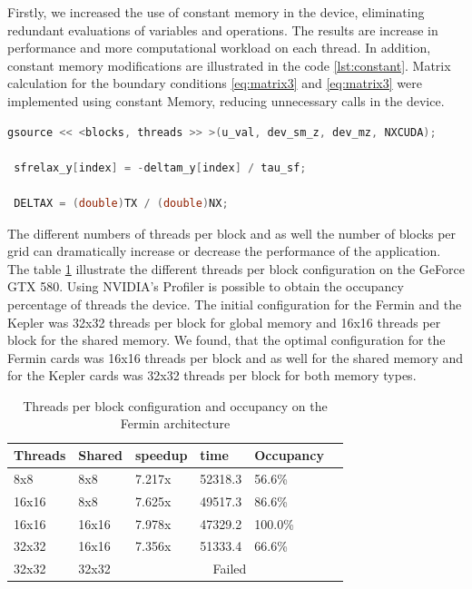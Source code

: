 Firstly, we increased the use of constant memory in the device, eliminating redundant evaluations of variables and operations. The results are increase in performance and more computational workload on each thread. In addition, constant memory modifications are illustrated in the code \ref{lst:constant}. Matrix calculation for the boundary conditions \ref{eq:matrix3} and \ref{eq:matrix3} were implemented using constant Memory, reducing unnecessary calls in the device.
 
 \begin{lstlisting}[language=C++,  label={lst:constant}, caption={Constant Memory changes}]
 gsource << <blocks, threads >> >(u_val, dev_sm_z, dev_mz, NXCUDA);
 
 sfrelax_y[index] = -deltam_y[index] / tau_sf;
     
 DELTAX = (double)TX / (double)NX;
\end{lstlisting}
 
The different numbers of threads per block and as well the number of blocks per grid can dramatically increase or decrease the performance of the application. The table \ref{tab:ocu} illustrate the different threads per block configuration on the GeForce GTX 580. Using NVIDIA's Profiler is possible to obtain the occupancy percentage of threads the device. The initial configuration for the Fermin and the Kepler was 32x32 threads per block for global memory and 16x16 threads per block for the shared memory. We found, that the optimal configuration for the Fermin cards was 16x16 threads per block and as well for the shared memory and for the Kepler cards was 32x32 threads per block for both memory types. 

\begin{table}[h]
\centering
  \begin{tabular} { | l | l | l | l | l | l | }
    \hline
    Threads & Shared & speedup & time & Occupancy \\
    \hline
     8x8 &  8x8 & 7.217x & 52318.3  & 56.6\% \\
    \hline
     16x16 & 8x8 & 7.625x & 49517.3 & 86.6\% \\
    \hline
    16x16 & 16x16 & 7.978x & 47329.2 & 100.0\% \\
    \hline
    32x32 & 16x16 & 7.356x & 51333.4 & 66.6\% \\
    \hline
    32x32 & 32x32 & \multicolumn{3}{|c|}{Failed}\\
    \hline
  \end{tabular}
  \caption{Threads per block configuration and occupancy on the Fermin architecture}
  \label{tab:ocu}
  \end{table}



